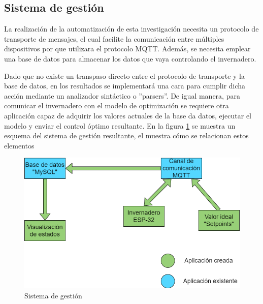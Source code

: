 \documentclass[letterpaper,conference]{IEEEtran}
\begin{document}
	

	\subsection{Sistema de gestión}
		
	La realización de la automatización de esta investigación necesita un protocolo de transporte de mensajes, el cual facilite la comunicación entre múltiples dispositivos por que utilizara el protocolo MQTT. Además, se necesita emplear una base de datos para almacenar los datos que vaya controlando el invernadero. 
	
	Dado que no existe un transpaso directo entre el protocolo de transporte y la base de datos, en los resultados se implementará una cara para cumplir dicha acción mediante un analizador sintáctico o ''parsers''. De igual manera, para comunicar el invernadero con el modelo de optimización se requiere otra aplicación capaz de adquirir los valores actuales de la base da datos, ejecutar el modelo y enviar el control óptimo resultante. En la figura \ref{fig:sist_gest} se muestra un esquema del sistema de gestión resultante, el muestra cómo se relacionan estos elementos
	
	\begin{figure}[h!]
	\centering
 	\includegraphics[width=0.8	\linewidth]{imagenes/sistema de gestion .png}
	\caption{Sistema de gestión}
	\label{fig:sist_gest}
	\end{figure}
\end{document}

